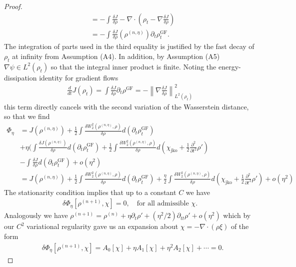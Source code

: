 \documentclass[reqno,11pt,letterpaper]{amsart}
\theoremstyle{plain}
\theoremstyle{definition}
\theoremstyle{remark}
\newcommand{\wass}{\mathrm{GF}}
\newcommand{\wagrad}{\nabla \frac{\delta J}{\delta \rho}}
\newcommand{\wadel}{\frac{\delta J}{\delta \rho}}
\newcommand{\jkoreg}{\chi_{\mathrm{jko}}}
\begin{document}
\begin{proof}
\begin{align*}
    &=  -\int \wadel -\nabla \cdot (\rho_t -\wagrad ) \\
    &= -\int \wadel (\rho^{(n,\eta)}) \partial_{t} \rho_{t}^{\wass}.
\end{align*}
The integration of parts used in the third equality is justified by the fast decay of $\rho_{t}$ at infinity from Assumption (A4). In addition, by Assumption (A5) $\nabla \psi \in L^{2}(\rho_{t})$ so that the integral inner product is finite. Noting the energy-dissipation identity for gradient flows
\begin{align}
    \frac{d}{dt} J(\rho_{t}) =
\int \frac{\delta J}{\delta \rho} \partial_{t} \rho^{\wass}=
- \left\lVert \nabla \frac{\delta J}{\delta \rho } \right\rVert_{L^{2}(\rho_{t})}^{2}
\end{align}
this term directly cancels with the second variation of the Wasserstein distance, so that we find
\begin{align*}
\Phi_{\eta} &= J(\rho^{(n,\eta)}) + \frac{1}{2} \int \frac{\delta W_{2}^{2} (\rho^{(n,\eta)}, \rho)}{\delta \rho} d(\partial_{t} \rho^{\wass}_{t}) \\
&+ \eta \biggl( \int \frac{\delta J (\rho^{(n,\eta)})}{\delta \rho} d(\partial_{t} \rho^{\wass}_{t}) + \frac{1}{2} \int \frac{\delta W_{2}^{2}(\rho^{(n, \eta)}, \rho)}{ \delta \rho} d\left( \jkoreg + \frac{1}{2} \frac{\partial^{2} }{\partial t^{2}} \rho'
    \right) \\
    &-\int \wadel d(\partial_{t} \rho_{t}^{\wass}) + o(\eta^{2}) \\
& = J(\rho^{(n,\eta)}) + \frac{1}{2} \int \frac{\delta W_{2}^{2} (\rho^{(n,\eta)}, \rho)}{\delta \rho} d(\partial_{t} \rho^{\wass}_{t}) + \frac{\eta}{2} \int \frac{\delta W_{2}^{2}(\rho^{(n, \eta)}, \rho)}{ \delta \rho} d\left( \jkoreg + \frac{1}{2} \frac{\partial^{2} }{\partial t^{2}}\rho'
    \right) + o(\eta^{2})
\end{align*}
The stationarity condition implies that up to a constant $C$ we have
\begin{align*}
    \delta\Phi_{\eta}[\rho^{(n+1)},\chi] = 0, \quad \text{for all admissible }\chi.
\end{align*}
Analogously we have $\rho^{(n+1)} = \rho^{(n)} + \eta \partial_{t} \rho' + (\eta^{2}/2) \partial_{tt} \rho' + o(\eta^{2})$ which by our $C^{2}$ variational regularity gave us an expansion about $\chi = - \nabla \cdot (\rho \xi)$ of the form
\begin{align*}
    &\delta \Phi_{\eta}[\rho^{(n+1)},\chi] =  A_{0}[\chi] + \eta A_{1}[\chi] + \eta^{2} A_{2} [\chi] + \cdots = 0.

\end{align*}
\end{proof}
\end{document}
